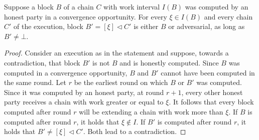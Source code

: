 \begin{lemma} \label{lem:pairing}
  Suppose a block $B$ of a chain $C$ with work interval $I(B)$
  was computed by an honest party in a convergence opportunity.
  For every $\xi \in I(B)$ and every chain $C'$ of the execution,
  block $B' = [\xi] \lhd C'$ is either $B$ or adversarial,
  as long as $B' \neq \bot$.
\end{lemma}
\begin{proof}
  Consider an execution as in the statement and suppose, towards a contradiction,
  that block $B'$ is not $B$ and is honestly computed.
  Since $B$ was computed in a convergence opportunity, $B$ and $B'$
  cannot have been computed in the same round. Let $r$ be the earliest round
  on which $B$ or $B'$ was computed. Since it was computed by
  an honest party, at round $r + 1$, every other honest party receives
  a chain with work greater or equal to $\xi$.
  It follows that every block computed
  after round $r$ will be extending a chain with work more than $\xi$.
  If $B$ is computed after round $r$, it holds that $\xi \not \in I$.
  If $B'$ is computed after round $r$, it holds that $B' \neq [\xi] \lhd C'$.
  Both lead to a contradiction. \Qed
\end{proof}

%

